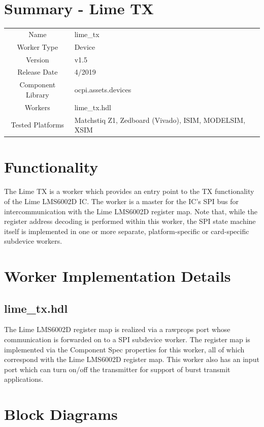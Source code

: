 \documentclass{article}
\author{} %
\date{Version \docVersion} %
\title{\docTitle}
\def\docVersion{1.5}
\def\comp{lime\_tx}
\def\Comp{Lime TX}
\begin{document}
\section*{Summary - \Comp}
\begin{tabular}{|c|M{13.5cm}|}
  \hline
                    &                  \\
  \hline
  Name              & \comp            \\
  \hline
  Worker Type       & Device           \\
  \hline
  Version           & v\docVersion   \\
  \hline
  Release Date      & 4/2019         \\
  \hline
  Component Library & ocpi.assets.devices     \\
  \hline
  Workers           & \comp.hdl        \\
  \hline
  Tested Platforms  & Matchstiq Z1, Zedboard (Vivado), ISIM, MODELSIM, XSIM \\
  \hline
\end{tabular}

\section*{Functionality}
  The \Comp{} is a worker which provides an entry point to the TX functionality of the Lime LMS6002D IC. The worker is a master for the IC's SPI bus for intercommunication with the Lime LMS6002D register map. Note that, while the register address decoding is performed within this worker, the SPI state machine itself is implemented in one or more separate, platform-specific or card-specific subdevice workers.

\section*{Worker Implementation Details}
\subsection*{\comp.hdl}
The Lime LMS6002D register map is realized via a rawprops port whose communication is forwarded on to a SPI subdevice worker. The register map is implemented via the Component Spec properties for this worker, all of which correspond with the Lime LMS6002D register map. This worker also has an input port which can turn on/off the transmitter for support of burst transmit applications.

\section*{Block Diagrams}
\end{document}
